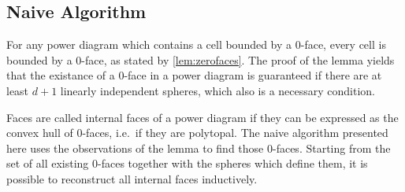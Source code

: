 \subsection{Naive Algorithm}
\label{sub:naive_algorithm}
For any power diagram which contains a cell bounded by a $0$-face, every cell is bounded by a $0$-face, as stated by \cref{lem:zerofaces}.
The proof of the lemma yields that the existance of a $0$-face in a power diagram is guaranteed if there are at least $d+1$ linearly independent spheres, which also is a necessary condition.

Faces are called internal faces of a power diagram if they can be expressed as the convex hull of $0$-faces, i.e.~if they are polytopal.
The naive algorithm presented here uses the observations of the lemma to find those $0$-faces.
Starting from the set of all existing $0$-faces together with the spheres which define them, it is possible to reconstruct all internal faces inductively.

